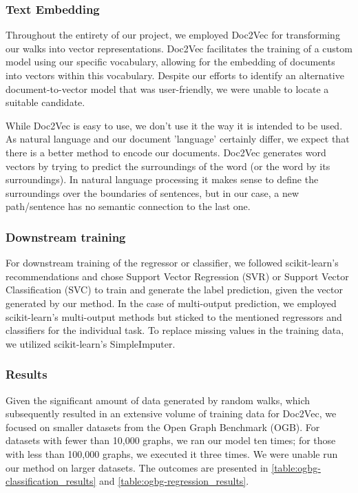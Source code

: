 \subsubsection{Text Embedding}
Throughout the entirety of our project, we employed Doc2Vec\cite{2014doc2vec} for transforming our walks into vector representations. Doc2Vec facilitates the training of a custom model using our specific vocabulary, allowing for the embedding of documents into vectors within this vocabulary. Despite our efforts to identify an alternative document-to-vector model that was user-friendly, we were unable to locate a suitable candidate.

While Doc2Vec is easy to use, we don't use it the way it is intended to be used. As natural language and our document 'language' certainly differ, we expect that there is a better method to encode our documents. Doc2Vec generates word vectors by trying to predict the surroundings of the word (or the word by its surroundings). In natural language processing it makes sense to define the surroundings over the boundaries of sentences, but in our case, a new path/sentence has no semantic connection to the last one.

\subsubsection{Downstream training}
For downstream training of the regressor or classifier, we followed scikit-learn's recommendations and chose Support Vector Regression (SVR) or Support Vector Classification (SVC) to train and generate the label prediction, given the vector generated by our method. In the case of multi-output prediction, we employed scikit-learn's multi-output methods but sticked to the mentioned regressors and classifiers for the individual task. To replace missing values in the training data, we utilized scikit-learn's SimpleImputer.

\subsubsection{Results}
Given the significant amount of data generated by random walks, which subsequently resulted in an extensive volume of training data for Doc2Vec, we focused on smaller datasets from the Open Graph Benchmark (OGB). For datasets with fewer than 10,000 graphs, we ran our model ten times; for those with less than 100,000 graphs, we executed it three times. We were unable run our method on larger datasets. The outcomes are presented in \autoref{table:ogbg-classification_results} and \autoref{table:ogbg-regression_results}.


